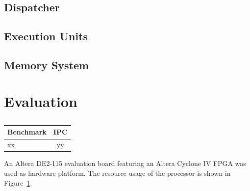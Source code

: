 \documentclass[conference]{IEEEtran}
\begin{document}
\subsection{Dispatcher}

\subsection{Execution Units}

\subsection{Memory System} \label{sec:memory}

\section{Evaluation} \label{sec:eval}




\begin{table} [h]
	\caption{}
	\centering
	\begin{tabular}{l c}
			Benchmark & IPC \\
		\midrule
			xx & yy\\
	\end{tabular}
	
	
	\label{tab:results}
\end{table}


An Altera DE2-115 evaluation board featuring an Altera Cyclone IV FPGA was used as hardware platform. The resource usage of the processor is shown in Figure~\ref{tab:results}. %
\end{document}

